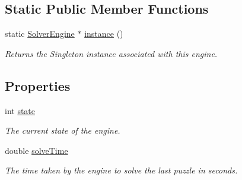 \subsection*{Static Public Member Functions}
\begin{DoxyCompactItemize}
\item 
static \mbox{\hyperlink{class_solver_engine}{Solver\+Engine}} $\ast$ \mbox{\hyperlink{class_solver_engine_abc1e088d35a6702a58c57e3344348eab}{instance}} ()
\begin{DoxyCompactList}\small\item\em Returns the Singleton instance associated with this engine. \end{DoxyCompactList}\end{DoxyCompactItemize}
\subsection*{Properties}
\begin{DoxyCompactItemize}
\item 
int \mbox{\hyperlink{class_solver_engine_a6ac564f91cd5c523ece2c561a37b8263}{state}}
\begin{DoxyCompactList}\small\item\em The current state of the engine. \end{DoxyCompactList}\item 
double \mbox{\hyperlink{class_solver_engine_aac9c7fba1a049fe08bcfd341700840fb}{solve\+Time}}
\begin{DoxyCompactList}\small\item\em The time taken by the engine to solve the last puzzle in seconds. \end{DoxyCompactList}\end{DoxyCompactItemize}
